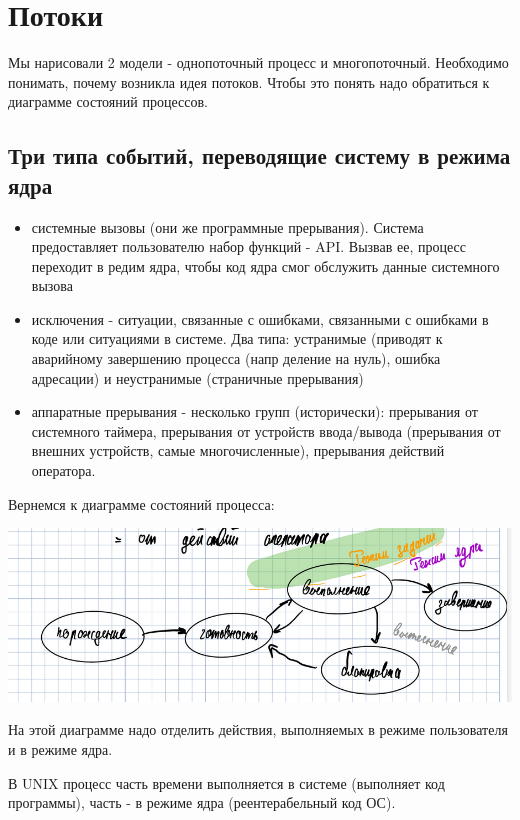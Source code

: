 \documentclass[a4paper, 12pt]{report}
\begin{document}
	\section*{Потоки}
	
	Мы нарисовали 2 модели - однопоточный процесс и многопоточный. Необходимо понимать, почему возникла идея потоков. Чтобы это понять надо обратиться к диаграмме состояний процессов.
	
	\subsection*{Три типа событий, переводящие систему в режима ядра}
	
	\begin{itemize}
		\item системные вызовы (они же программные прерывания). Система предоставляет пользователю набор функций - API. Вызвав ее, процесс переходит в редим ядра, чтобы код ядра смог обслужить данные системного вызова
		
		\item исключения - ситуации, связанные с ошибками, связанными с ошибками в коде или ситуациями в системе. Два типа: устранимые (приводят к аварийному завершению процесса (напр деление на нуль), ошибка адресации) и неустранимые (страничные прерывания)
		
		\item аппаратные прерывания - несколько групп (исторически): прерывания от системного таймера, прерывания от устройств ввода/вывода (прерывания от внешних устройств, самые многочисленные), прерывания действий оператора.
	\end{itemize}

	Вернемся к диаграмме состояний процесса:
	
	\includegraphics[width=\linewidth]{1}
	
	На этой диаграмме надо отделить действия, выполняемых в режиме пользователя и в режиме ядра.
	
	В UNIX процесс часть времени выполняется в системе (выполняет код программы), часть - в режиме ядра (реентерабельный код ОС).
	
\end{document}
